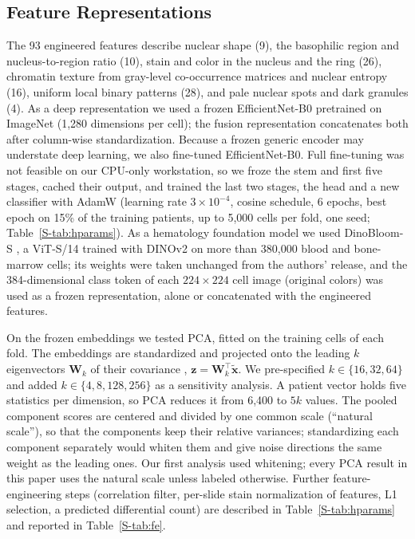 \documentclass[journal]{IEEEtran}
\begin{document}
\subsection{Feature Representations}
The 93 engineered features describe nuclear shape (9), the basophilic region and nucleus-to-region ratio (10), stain and color in the nucleus and the ring (26), chromatin texture from gray-level co-occurrence matrices \cite{haralick1973texture} and nuclear entropy (16), uniform local binary patterns \cite{ojala2002lbp} (28), and pale nuclear spots and dark granules (4). As a deep representation we used a frozen EfficientNet-B0 \cite{tan2019efficientnet} pretrained on ImageNet (1,280 dimensions per cell); the fusion representation concatenates both after column-wise standardization. Because a frozen generic encoder may understate deep learning, we also fine-tuned EfficientNet-B0. Full fine-tuning was not feasible on our CPU-only workstation, so we froze the stem and first five stages, cached their output, and trained the last two stages, the head and a new classifier with AdamW \cite{loshchilov2019adamw} (learning rate $3\times10^{-4}$, cosine schedule, 6 epochs, best epoch on 15\% of the training patients, up to 5,000 cells per fold, one seed; Table~\ref{S-tab:hparams}). As a hematology foundation model we used DinoBloom-S \cite{koch2024dinobloom}, a ViT-S/14 trained with DINOv2 \cite{oquab2024dinov2} on more than 380,000 blood and bone-marrow cells; its weights were taken unchanged from the authors' release, and the 384-dimensional class token of each $224\times224$ cell image (original colors) was used as a frozen representation, alone or concatenated with the engineered features.

On the frozen embeddings we tested PCA, fitted on the training cells of each fold. The embeddings are standardized and projected onto the leading $k$ eigenvectors $\mathbf{W}_k$ of their covariance \cite{jolliffe2016pca}, $\mathbf{z}=\mathbf{W}_k^{\top}\tilde{\mathbf{x}}$. We pre-specified $k\in\{16,32,64\}$ and added $k\in\{4,8,128,256\}$ as a sensitivity analysis. A patient vector holds five statistics per dimension, so PCA reduces it from 6,400 to $5k$ values. The pooled component scores are centered and divided by one common scale (``natural scale''), so that the components keep their relative variances; standardizing each component separately would whiten them and give noise directions the same weight as the leading ones. Our first analysis used whitening; every PCA result in this paper uses the natural scale unless labeled otherwise. Further feature-engineering steps (correlation filter, per-slide stain normalization of features, L1 selection, a predicted differential count) are described in Table~\ref{S-tab:hparams} and reported in Table~\ref{S-tab:fe}.
\end{document}
